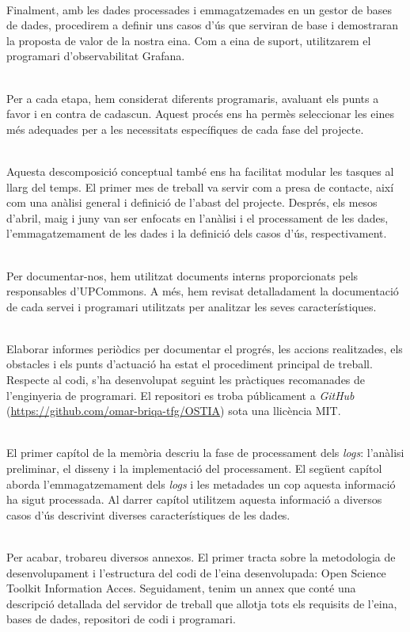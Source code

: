 \noindent \\
Finalment, amb les dades processades i emmagatzemades en un gestor de bases de dades, procedirem a definir uns casos d'ús que serviran de base i demostraran la proposta de valor de la nostra eina.
Com a eina de suport, utilitzarem el programari d'observabilitat Grafana.

\clearpage

\noindent \\
Per a cada etapa, hem considerat diferents programaris, avaluant els punts a favor i en contra de cadascun.
Aquest procés ens ha permès seleccionar les eines més adequades per a les necessitats específiques de cada fase del projecte.

\noindent \\
Aquesta descomposició conceptual també ens ha facilitat modular les tasques al llarg del temps.
El primer mes de treball va servir com a presa de contacte, així com una anàlisi general i definició de l'abast del projecte.
Després, els mesos d'abril, maig i juny van ser enfocats en l'anàlisi i el processament de les dades, l'emmagatzemament de les dades i la definició dels casos d'ús, respectivament.

\noindent \\
Per documentar-nos, hem utilitzat documents interns proporcionats pels responsables d'\gls{UPCommons}.
A més, hem revisat detalladament la documentació de cada servei i programari utilitzats per analitzar les seves característiques.

\noindent \\
Elaborar informes periòdics per documentar el progrés, les accions realitzades, els obstacles i els punts d'actuació ha estat el procediment principal de treball.
Respecte al codi, s'ha desenvolupat seguint les pràctiques recomanades de l'enginyeria de programari.
El repositori es troba públicament a \textit{\gls{GitHub}} (\url{https://github.com/omar-briqa-tfg/OSTIA}) sota una llicència MIT.

\noindent \\
El primer capítol de la memòria descriu la fase de processament dels \textit{\gls{log}s}: l'anàlisi preliminar, el disseny i la implementació del processament.
El següent capítol aborda l'emmagatzemament dels \textit{\gls{log}s} i les metadades un cop aquesta informació ha sigut processada.
Al darrer capítol utilitzem aquesta informació a diversos casos d'ús descrivint diverses característiques de les dades.

\noindent \\
Per acabar, trobareu diversos annexos.
El primer tracta sobre la metodologia de desenvolupament i l'estructura del codi de l'eina desenvolupada: Open Science Toolkit Information Acces.
Seguidament, tenim un annex que conté una descripció detallada del servidor de treball que allotja tots els requisits de l'eina, bases de dades, repositori de codi i programari.

